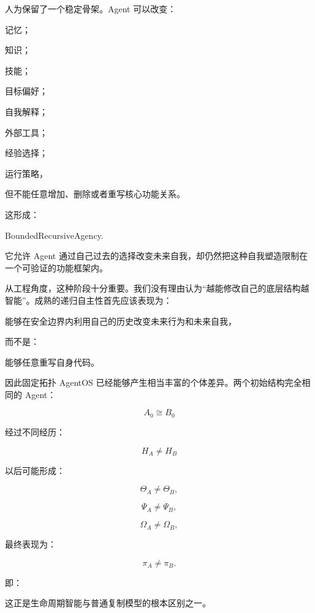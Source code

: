 人为保留了一个稳定骨架。Agent 可以改变：

记忆；

知识；

技能；

目标偏好；

自我解释；

外部工具；

经验选择；

运行策略，

但不能任意增加、删除或者重写核心功能关系。

这形成：

\begin{statementbox}
BoundedRecursiveAgency.
\end{statementbox}

它允许 Agent 通过自己过去的选择改变未来自我，却仍然把这种自我塑造限制在一个可验证的功能框架内。

从工程角度，这种阶段十分重要。我们没有理由认为“越能修改自己的底层结构越智能”。成熟的递归自主性首先应该表现为：

\begin{statementbox}
能够在安全边界内利用自己的历史改变未来行为和未来自我，
\end{statementbox}

而不是：

\begin{statementbox}
能够任意重写自身代码。
\end{statementbox}

因此固定拓扑 AgentOS 已经能够产生相当丰富的个体差异。两个初始结构完全相同的 Agent：

\[
A_0
\cong
B_0
\]

经过不同经历：

\[
H_A\neq H_B
\]

以后可能形成：

\[
\Theta_A\neq\Theta_B,
\]

\[
\Psi_A\neq\Psi_B,
\]

\[
\Omega_A\neq\Omega_B,
\]

最终表现为：

\[
\pi_A\neq\pi_B.
\]

即：

\begin{statementbox}
\centering
{}
\end{statementbox}

这正是生命周期智能与普通复制模型的根本区别之一。

